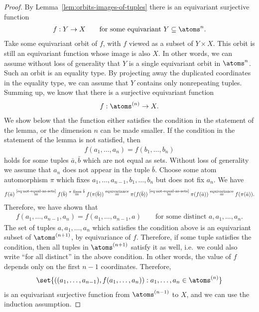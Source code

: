 \begin{proof}
 By Lemma~\ref{lem:orbits-images-of-tuples} there is an equivariant surjective function
 \begin{align*}
 f : Y \to X \qquad \text{for some equivariant $Y \subseteq \atoms^n$}.
 \end{align*}
 Take some equivariant orbit of $f$, with $f$ viewed as a subset of $Y \times X$. This orbit is still an equivariant function whose image is also $X$. In other words, we can assume without loss of generality that $Y$ is a single equivariant orbit in $\atoms^n$. Such an orbit is an equality type. By projecting away the duplicated coordinates in the equality type, we can assume that $Y$ contains only nonrepeating tuples. Summing up, we know that there is a surjective equivariant function
 \begin{align*}
 f : \atoms^{(n)} \to X.
 \end{align*}
 We show below that the function either satisfies the condition in the statement of the lemma, or the dimension $n$ can be made smaller. If the condition in the statement of the lemma is not satisfied, then 
 \begin{align}\label{eq:not-equal-as-sets}
 f(a_1,\ldots,a_n) = f(b_1,\ldots,b_n) 
 \end{align}
 holds for some tuples $\bar a, \bar b$ which are not equal as sets. Without loss of generality we assume that $a_n$ does not appear in the tuple $\bar b$. Choose some 
 atom automorphism $\pi$ which fixes $a_1,\ldots,a_{n-1},b_1,\ldots,b_n$ but does not fix $a_n$. We have 
 \begin{eqnarray*}
 f(\bar a) \stackrel{\text{\eqref{eq:not-equal-as-sets}}} =
 f(\bar b) \stackrel{\text{$\pi$ fixes $\bar b$}} = 
 f(\pi(\bar b))\stackrel{\text{equivariance}} = 
 \pi(f(\bar b)) \stackrel{\text{\eqref{eq:not-equal-as-sets}}} = 
 \pi(f(\bar a)) \stackrel{\text{equivariance}} =
 f(\pi(\bar a)).
 \end{eqnarray*}
 Therefore, we have shown that 
 \begin{align*}
 f(a_1,\ldots,a_{n-1},a_n) = f(a_1,\ldots,a_{n-1},a) \qquad \text{for some distinct $a,a_1,\ldots,a_n$.}
 \end{align*}
 The set of tuples $a,a_1,\ldots,a_n$ which satisfies the condition above is an equivariant subset of $\atoms^{(n+1)}$, by equivariance of $f$. Therefore, if some tuple satisfies the condition, then all tuples in $\atoms^{(n+1)}$ satisfy it as well, i.e.~we could also write ``for all distinct'' in the above condition.
 In other words, the value of $f$ depends only on the first $n-1$ coordinates. Therefore, \begin{align*}
 \set{((a_1,\ldots,a_{n-1}),f(a_1,\ldots,a_n)) : a_1,\ldots,a_{n} \in \atoms^{(n)}}
 \end{align*}
 is an equivariant surjective function from $\atoms^{(n-1)}$ to $X$, and we can use the induction assumption. 
\end{proof}

